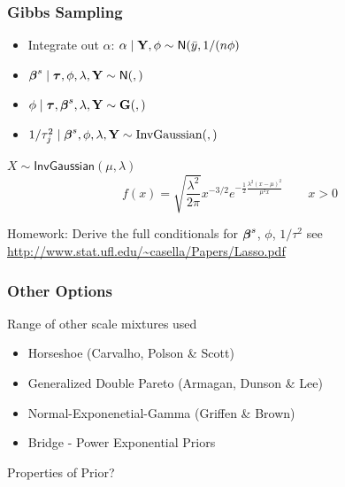 \documentclass[]{beamer}
\begin{document}
\begin{frame}
  \frametitle{Gibbs Sampling}
  \begin{itemize}
  \item Integrate out $\alpha$: $\alpha \mid \mathbf{Y}, \phi \sim \textsf{N}(\bar{y},
    1/(n \phi)$  \pause
\item $\boldsymbol{\beta}^s \mid \boldsymbol{\tau}, \phi, \lambda, \mathbf{Y} \sim \textsf{N}(, )$   \pause
\item $\phi \mid \boldsymbol{\tau}, \boldsymbol{\beta}^s, \lambda, \mathbf{Y} \sim \mathbf{G}( , ) $  \pause
\item $1/\tau_j^2 \mid \boldsymbol{\beta}^s, \phi, \lambda, \mathbf{Y} \sim \text{InvGaussian}(
  , )$  \pause
  \end{itemize}
$X \sim \textsf{InvGaussian}(\mu,  \lambda)$
$$
f(x) =  \sqrt{\frac{\lambda^2}{2 \pi}}  x^{-3/2} e^{- \frac{1}{2} \frac{
    \lambda^2( x - \mu)^2} {\mu^2 x}} \qquad x > 0
$$  \pause

Homework:  Derive the full conditionals for $\boldsymbol{\beta}^s$, $\phi$,
$1/\tau^2$  see \url{http://www.stat.ufl.edu/~casella/Papers/Lasso.pdf}
\end{frame}
\begin{frame}
  \frametitle{Other Options}
  Range of other scale mixtures used  \pause
  \begin{itemize}
  \item Horseshoe  (Carvalho, Polson \& Scott)  \pause
  \item Generalized Double Pareto (Armagan, Dunson \& Lee)  \pause
  \item Normal-Exponenetial-Gamma (Griffen \& Brown)  \pause
  \item Bridge - Power Exponential Priors  \pause
   \end{itemize}
Properties of Prior?   \pause
\end{frame}
\end{document}
